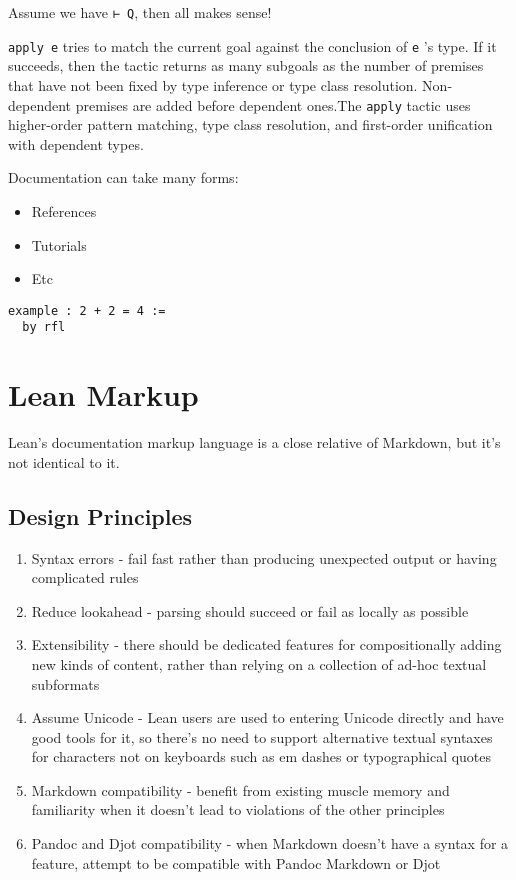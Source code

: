 \documentclass{memoir}
\begin{document}
Assume we have \Verb|⊢ Q|, then all makes sense!

\Verb|apply e|
 tries to match the current goal against the conclusion of \Verb|e|
's type.
If it succeeds, then the tactic returns as many subgoals as the number of premises that
have not been fixed by type inference or type class resolution.
Non-dependent premises are added before dependent ones.The \Verb|apply|
 tactic uses higher-order pattern matching, type class resolution,
and first-order unification with dependent types.

Documentation can take many forms:

\begin{itemize}
\item References\item Tutorials\item Etc
\end{itemize}


\begin{verbatim}
example : 2 + 2 = 4 :=
  by rfl

\end{verbatim}







\section{Lean Markup}

Lean's documentation markup language is a close relative of Markdown, but it's not identical to it.



\subsection{Design Principles}

\begin{enumerate}
\item Syntax errors - fail fast rather than producing unexpected output or having complicated rules\item Reduce lookahead - parsing should succeed or fail as locally as possible\item Extensibility - there should be dedicated features for compositionally adding new kinds of content, rather than relying on a collection of ad-hoc textual subformats\item Assume Unicode - Lean users are used to entering Unicode directly and have good tools for it, so there's no need to support alternative textual syntaxes for characters not on keyboards such as em dashes or typographical quotes\item Markdown compatibility - benefit from existing muscle memory and familiarity when it doesn't lead to violations of the other principles\item Pandoc and Djot compatibility - when Markdown doesn't have a syntax for a feature, attempt to be compatible with Pandoc Markdown or Djot
\end{enumerate}
\end{document}
